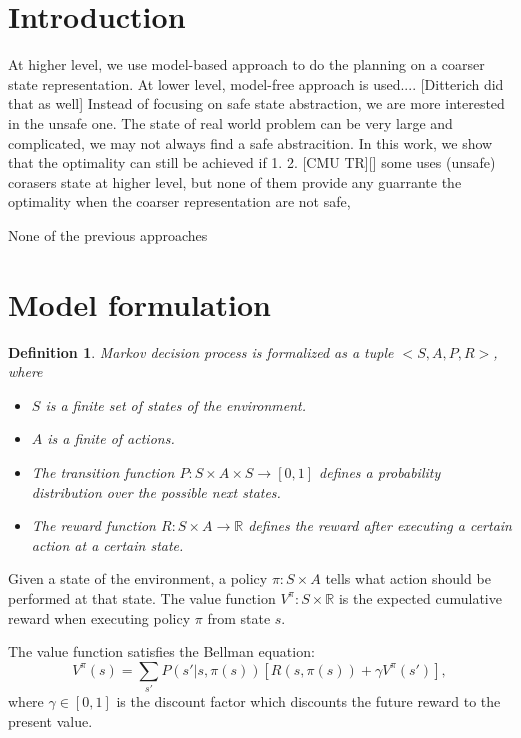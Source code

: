 \documentclass{article} %
\newtheorem{definition}{Definition}
\begin{document}
\section{Introduction}

At higher level, we use model-based approach to do the planning on a coarser state representation. 
At lower level, model-free approach is used....
[Ditterich did that as well]
Instead of focusing on safe state abstraction, we are more interested in the unsafe one.
The state of real world problem can be very large and complicated, we may 
not always find a safe abstracition. In this work, we show that the 
optimality can still be achieved if 1. 2. 
[CMU TR][] some uses (unsafe) corasers state at higher level, but none of them 
provide any guarrante the optimality when the coarser representation are
not safe, 

None of the previous approaches 

\section{Model formulation}

\begin{definition} Markov decision process is formalized as a tuple $<S, A, P, R>$, where
\begin{itemize}{}
\item $S$ is a finite set of states of the environment.
\item $A$ is a finite of actions.
\item The transition function $P:S \times A \times S \rightarrow [0, 1]$ defines a probability distribution over the possible next states. 
\item The reward function $R:S \times A \rightarrow \mathbb{R}$ defines the reward after executing a certain action at a certain state.
\end{itemize}
\end{definition}

Given a state of the environment, a policy $\pi: S \times A$ tells what action should be performed at that state. 
The value function $V^{\pi}: S \times \mathbb{R}$ is the expected cumulative reward when executing
policy $\pi$ from state $s$.

The value function satisfies the Bellman equation:
\begin{equation}
    V^{\pi}(s) = \sum_{s'}P(s'|s, \pi(s))[R(s, \pi(s)) + \gamma V^{\pi}(s')],
    \label{eq:V}
\end{equation}
where $\gamma \in [0, 1]$ is the discount factor which discounts the future reward to the present value.
\end{document}
